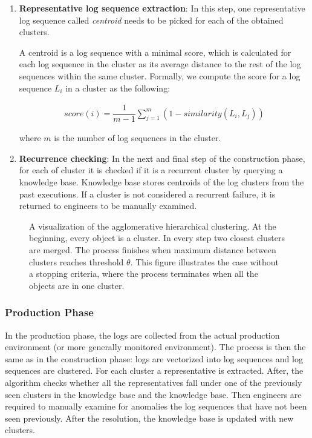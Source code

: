 \begin{enumerate}
    \item \textbf{Representative log sequence extraction}: In this step, one representative log sequence called \textit{centroid} needs to be picked for each of the obtained clusters.
    
    A centroid is a log sequence with a minimal score, which is calculated for each log sequence in the cluster as its average distance to the rest of the log sequences within the same cluster. Formally, we compute the score for a log sequence $L_i$ in a cluster as the following:
    
    \begin{align*}
        score(i) = \dfrac{1}{m - 1} \sum_{j = 1}^m (1 - similarity(L_i, L_j))
    \end{align*}
    
    where $m$ is the number of log sequences in the cluster.
    
    \item \textbf{Recurrence checking}: In the next and final step of the construction phase, for each of cluster it is checked if it is a recurrent cluster by querying a knowledge base. Knowledge base stores centroids of the log clusters from the past executions. If a cluster is not considered a recurrent failure, it is returned to engineers to be manually examined.
\end{enumerate}

\begin{figure}\centering
	
	\caption{A visualization of the agglomerative hierarchical clustering. At the beginning, every object is a cluster. In every step two closest clusters are merged. The process finishes when maximum distance between clusters reaches threshold $\theta$. This figure illustrates the case without a stopping criteria, where the process terminates when all the objects are in one cluster.}
	\label{figure:hierarchicalClustering}
\end{figure}


\subsubsection*{Production Phase}
In the production phase, the logs are collected from the actual production environment (or more generally monitored environment). The process is then the same as in the construction phase: logs are vectorized into log sequences and log sequences are clustered. For each cluster a representative is extracted. After, the algorithm checks whether all the representatives fall under one of the previously seen clusters in the knowledge base and the knowledge base. Then engineers are required to manually examine for anomalies the log sequences that have not been seen previously. After the resolution, the knowledge base is updated with new clusters.
 
